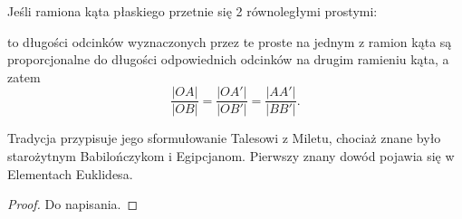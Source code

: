 
\begin{theorem}[Talesa]
    Jeśli ramiona kąta płaskiego przetnie się 2 równoległymi prostymi:
    \begin{center}
        \end{center}
    to długości odcinków wyznaczonych przez te proste na jednym z ramion kąta są proporcjonalne do długości odpowiednich odcinków na drugim ramieniu kąta, a zatem
    \begin{equation}
        \frac{|OA|}{|OB|} = \frac{|OA'|}{|OB'|} = \frac{|AA'|}{|BB'|}.
    \end{equation}
\end{theorem}

Tradycja przypisuje jego sformułowanie Talesowi z Miletu, chociaż znane było starożytnym Babilończykom i Egipcjanom.
%
Pierwszy znany dowód pojawia się w Elementach Euklidesa.

\begin{proof}
    Do napisania.
\end{proof}
